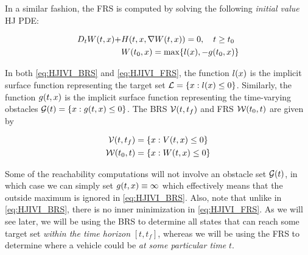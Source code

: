 In a similar fashion, the FRS is computed by solving the following \textit{initial value} HJ PDE:

\begin{equation}
\label{eq:HJIVI_FRS}
\begin{aligned}
D_t \valfuncfwd(t, \state) + &\ham(t, \state, \nabla \valfuncfwd(t, \state)) = 0 , \quad t \ge t_0  \\
&\valfuncfwd(t_0, \state) = \max\{\fc(\state), -\obsfunc(t_0, \state)\}
\end{aligned}
\end{equation}

In both \eqref{eq:HJIVI_BRS} and \eqref{eq:HJIVI_FRS}, the function $l(x)$ is the implicit surface function representing the target set $\mathcal{L} = \{x: l(x) \le 0\}$. Similarly, the function $g(t, x)$ is the implicit surface function representing the time-varying obstacles $\mathcal{G}(t) = \{x: g(t,x)\le 0\}$. The BRS $\mathcal{V}(t, t_f)$ and FRS $\mathcal{W}(t_0, t)$ are given by

\begin{equation}
\label{eq:implicitValfuncs}
\begin{aligned}
\brs(t, t_f) &= \{\state: \valfunc(t, \state) \le 0\} \\
\frs(t_0, t) &= \{\state: \valfuncfwd(t, \state) \le 0 \}
\end{aligned}
\end{equation}

Some of the reachability computations will not involve an obstacle set $\mathcal{G}(t)$, in which case we can simply set $g(t, x) \equiv \infty$ which effectively means that the outside maximum is ignored in \eqref{eq:HJIVI_BRS}. Also, note that unlike in \eqref{eq:HJIVI_BRS}, there is no inner minimization in \eqref{eq:HJIVI_FRS}. As we will see later, we will be using the BRS to determine all states that can reach some target set \textit{within the time horizon} $[t,t_f]$, whereas we will be using the FRS to determine where a vehicle could be \textit{at some particular time} $t$. %
%
%

